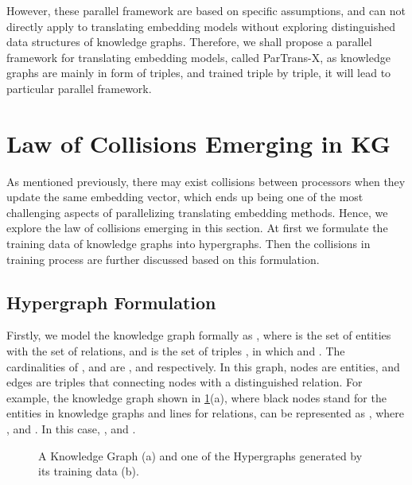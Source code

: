 \documentclass[sigconf]{acmart}
\begin{document}
However, these parallel framework are based on specific assumptions, and can not directly apply to translating embedding models without exploring distinguished data structures of knowledge graphs. 
Therefore, we shall propose  a parallel framework for translating embedding models, called ParTrans-X, as knowledge graphs are mainly in form of triples, and trained triple by triple, it will lead to particular parallel framework.



\section{Law of Collisions Emerging in KG}
As mentioned previously, there may exist collisions between processors  when they update the same embedding vector, which ends up being one of the most challenging aspects of parallelizing translating embedding methods. Hence, we explore the law of collisions emerging in this section.
At first we formulate the training data of knowledge graphs into hypergraphs. Then  the collisions in training process are further discussed based on this formulation.


\subsection{Hypergraph Formulation}


Firstly, we model the knowledge graph formally as , where  is the set of entities with  the set of relations, and  is the set of triples , in which  and . The  cardinalities of ,  and  are ,  and  respectively. In this graph, nodes are entities, and edges are triples that connecting nodes with a distinguished relation.
For example, the knowledge graph shown in \figurename \ref{hypergraph}(a), where black nodes stand for the entities in knowledge graphs and lines for relations, can be represented as , where ,  and . In this case, ,  and .

\begin{figure}[!h]
\centering
{}
\vspace{-7pt}
\caption{A Knowledge Graph (a) and one of the Hypergraphs generated by its training data (b). }
\label{hypergraph}
\vspace{-7pt}
\end{figure}
\end{document}
